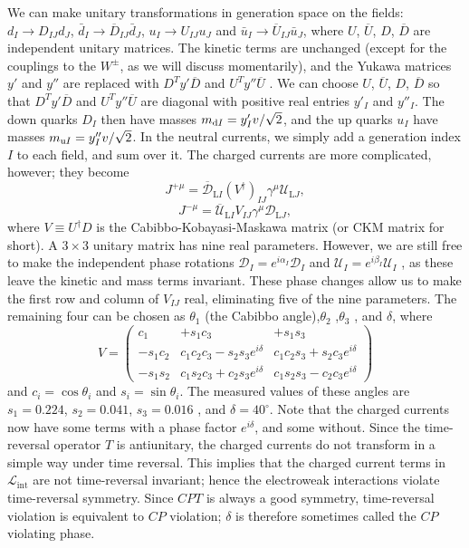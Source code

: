We can make unitary transformations in generation space on the fields: $d_I \to D_{IJ}d_J $, $\bar{d}_I \to \overline{D}_{IJ}\bar{d}_J$, $u_I \to U_{IJ}u_J $ and $\bar{u}_I \to \overline{U}_{IJ}\bar{u}_J$, where $U$, $\overline{U}$, $D$, $\overline{D}$ are independent unitary matrices. 
The kinetic terms are unchanged (except for the couplings to the $W^{\pm}$, as we will discuss momentarily), and the Yukawa matrices $y'$ and $y''$ are replaced with $D^T y' \overline{D}$  and $U^T y'' \overline{U}$ . We can choose
$U$, $\overline{U}$, $D$, $\overline{D}$ so that $D^T y' \overline{D}$  and $U^T y'' \overline{U}$ are diagonal with positive real entries $y'_I$ and $y''_I$. The down quarks $D_I$ then have masses $m_{{\rm d}I} = {y'_I v}/{\sqrt{2}}$,
and the up quarks $u_I$ have masses $m_{{\rm u}I} = {y''_I v}/{\sqrt{2}}$. 
In the neutral currents, we simply add a generation index $I$ to each field, and sum over it. 
The charged currents are more complicated, however; they become 
\[J^{+\mu} = \overline{\mathcal{D}}_{\mathrm{L}I} (V^{\dagger})_{IJ} \gamma^{\mu} \mathcal{U}_{\mathrm{L}J} ,\]
\[J^{-\mu} = \overline{\mathcal{U}}_{\mathrm{L}I} V_{IJ} \gamma^{\mu} \mathcal{D}_{\mathrm{L}J},\]
where $V \equiv U^{\dagger} D$ is the Cabibbo-Kobayasi-Maskawa matrix (or CKM matrix for short).
A $3 \times 3$ unitary matrix has nine real parameters. However, we are still free to make the independent phase rotations $\mathcal{D}_I = e^{i\alpha_I} \mathcal{D}_I$ and $\mathcal{U}_I = e^{i\beta_I} \mathcal{U}_I$ , as
these leave the kinetic and mass terms invariant. These phase changes allow us to make the first row and column of $V_{IJ}$ real, eliminating five of the nine parameters. The remaining four can be chosen as $\theta_1$ (the Cabibbo angle),$\theta_2$ ,$\theta_3$ , and $\delta$, where
\[V = \begin{pmatrix}
c_1 & +s_1c_3 & +s_1s_3 \\
-s_1c_2 & c_1c_2c_3 - s_2s_3e^{i\delta} & c_1c_2s_3 + s_2c_3e^{i\delta} \\
-s_1s_2 & c_1s_2c_3 + c_2s_3e^{i\delta} & c_1s_2s_3- c_2c_3 e^{i\delta}
\end{pmatrix} \]
and $c_i = \cos\theta_i$ and $s_i = \sin\theta_i$. The measured values of these angles are $s_1=0.224$, $s_2 = 0.041$, $s_3 = 0.016$ , and $\delta = 40^{\circ}$. Note that the charged currents now have some terms with a phase factor $e^{i\delta}$, and some without. 
Since the time-reversal operator $T$ is antiunitary, the charged currents do not transform in a simple way under time reversal. This implies that the charged current terms in $\mathcal{L}_{\mathrm{int}}$ are not time-reversal invariant; hence the electroweak interactions violate time-reversal symmetry.
Since $CPT$ is always a good symmetry, time-reversal violation is equivalent to $CP$ violation; $\delta$ is therefore sometimes called the $CP$ violating phase.

